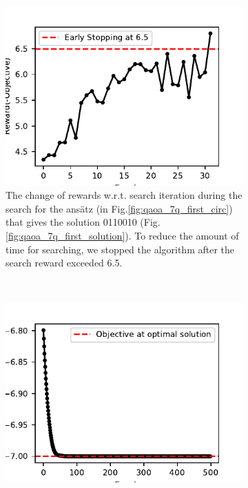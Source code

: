 \documentclass[a4paper,onecolumn,11pt]{quantumarticle}
\begin{document}

\begin{figure}[H]
    \centering
    \begin{subfigure}[t]{0.48\linewidth}
        \includegraphics[width=0.95\linewidth]{Figures/fig_qaoa_7q_1_search_rewards.pdf}
        \caption{The change of rewards w.r.t. search iteration during the search for the ans\"atz (in Fig.\ref{fig:qaoa_7q_first_circ}) that gives the solution 0110010 (Fig. \ref{fig:qaoa_7q_first_solution}). To reduce the amount of time for searching, we stopped the algorithm after the search reward exceeded 6.5.}
        \label{fig:qaoa_search_reward_1}
    \end{subfigure}
    ~
    \begin{subfigure}[t]{0.48\linewidth}
        \includegraphics[width=\linewidth]{Figures/fig_qaoa_7q_1_fine_tune_loss.pdf}

\end{subfigure}
\end{figure}
\end{document}
